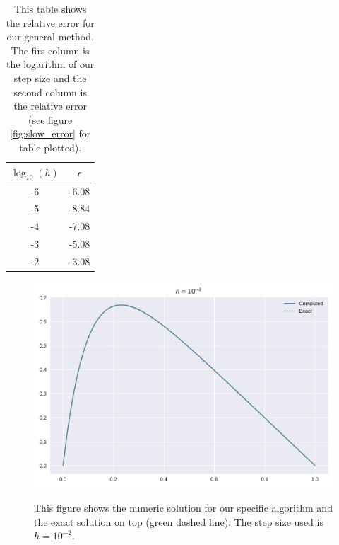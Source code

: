 \documentclass[reprint, english,notitlepage]{revtex4-1}  %
\begin{document}
\begin{table} [h]  %
	\begin{tabular}{||c | c||}
			\hline
			$\log_{10}(h)$ & $\epsilon$    \\ \hline
			-6 & -6.08    \\ \hline
			-5 & -8.84    \\ \hline
			-4 & -7.08    \\ \hline
			-3 & -5.08    \\ \hline
			-2 & -3.08    \\ \hline
	\end{tabular}
	\caption{This table shows the relative error for our general method. The firs column is the logarithm of our step size and the second column is the relative error (see figure \ref{fig:slow_error} for table plotted).}
	\label{tab:slow_error}
\end{table}


\begin{figure}[h]
	\centering
	\includegraphics[scale=0.5]{../output/fast_2.pdf}
	\label{fig:fast_2}
	\caption{This figure shows the numeric solution for our specific algorithm and the exact solution on top (green dashed line). The step size used is $h=10^{-2}$.}
\end{figure}
\end{document}
